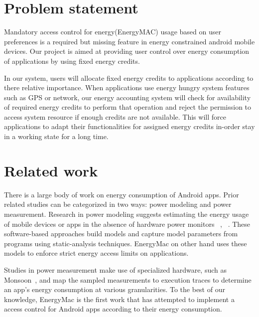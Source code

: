 
\section{Problem statement}

Mandatory access control for energy(EnergyMAC) usage based on user preferences is a required but missing feature in energy constrained android mobile devices. Our project is aimed at providing user control over energy consumption of applications by using fixed energy credits. 

 In our system, users will allocate fixed energy credits to applications according to there relative importance. When applications use energy hungry system features such as GPS or network, our energy accounting system will check for availability of required energy credits to perform that operation and reject the permission to access system resource if enough credits are not available. This will force applications to adapt their functionalities for assigned energy credits in-order stay in a working state for a long time. 


\section{Related work}

There is a large body of work on energy consumption of Android apps. Prior related studies can be categorized in two ways: power modeling and power measurement. Research in power modeling suggests estimating the energy usage of mobile devices or apps in the absence of hardware power
monitors ~\cite{hao2013estimating}, ~\cite{li2013calculating}. These software-based approaches build models and capture model parameters from programs using static-analysis techniques. EnergyMac on other hand uses these models to enforce strict energy access limits on applications.

Studies in power measurement make use of specialized hardware, such as Monsoon~\cite{yoon2012appscope}, and map the sampled measurements to execution traces to determine an app's energy consumption at various granularities. To the best of our knowledge, EnergyMac is the first work that has attempted to implement a access control for Android apps according to their energy consumption. 



